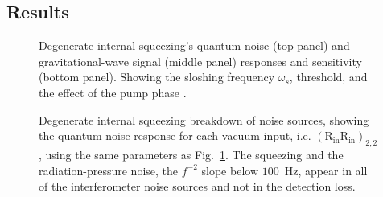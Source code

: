 \subsection{Results}


\begin{figure}
	\centering
	\caption{Degenerate internal squeezing's quantum noise (top panel) and gravitational-wave signal (middle panel) responses and sensitivity (bottom panel). Showing the sloshing frequency $\omega_s$, threshold, and the effect of the pump phase . }
	\label{fig:dIS_sensitivity}
\end{figure}

\begin{figure}
	\centering
	\caption{Degenerate internal squeezing breakdown of noise sources, showing the quantum noise response for each vacuum input, i.e. $(\text{R}_\text{in}\text{R}_\text{in})_{2,2}$, using the same parameters as Fig.~\ref{fig:dIS_sensitivity}. The squeezing and the radiation-pressure noise, the $f^{-2}$ slope below $100$~Hz, appear in all of the interferometer noise sources and not in the detection loss.}
	\label{fig:dIS_noise_budget}
\end{figure}


